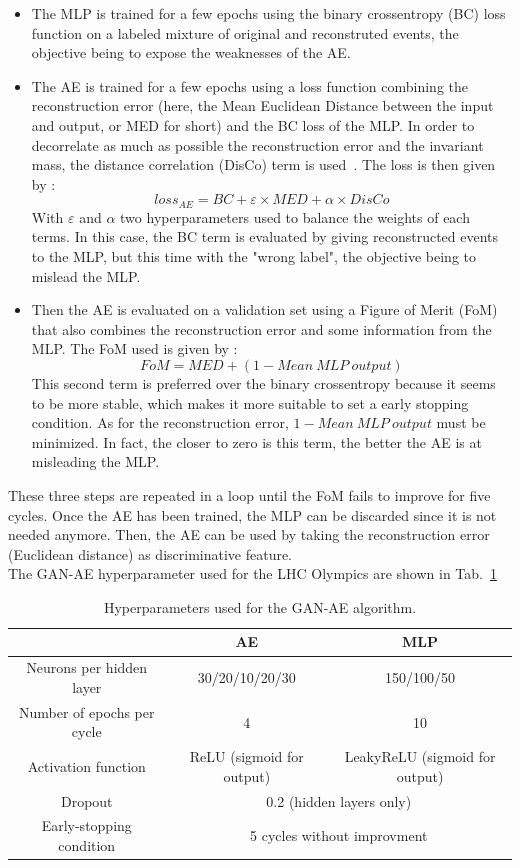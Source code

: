 \documentclass[letterpaper,11pt]{article}
\begin{document}
\begin{itemize}
	\item The MLP is trained for a few epochs using the binary crossentropy (BC) loss function on a labeled mixture of original and reconstruted events, the objective being to expose the weaknesses of the AE.
	
	\item The AE is trained for a few epochs using a loss function combining the reconstruction error (here, the Mean Euclidean Distance between the input and output, or MED for short) and the BC loss of the MLP.
	In order to decorrelate as much as possible the reconstruction error and the invariant mass, the distance correlation (DisCo) term is used~\cite{DiscoFever}.
	The loss is then given by :
	$$loss_{AE} = BC+\varepsilon\times MED+\alpha\times DisCo$$
	\noindent With $\varepsilon$ and $\alpha$ two hyperparameters used to balance the weights of each terms. In this case, the BC term is evaluated by giving reconstructed events to the MLP, but this time with the "wrong label", the objective being to mislead the MLP. 
	
	\item Then the AE is evaluated on a validation set using a Figure of Merit (FoM) that also combines the reconstruction error and some information from the MLP.
	The FoM used is given by :
	$$FoM = MED+(1-Mean~MLP~output)$$
	\noindent This second term is preferred over the binary crossentropy because it seems to be more stable, which makes it more suitable to set a early stopping condition.
	As for the reconstruction error, $1-Mean~MLP~output$ must be minimized.
	In fact, the closer to zero is this term, the better the AE is at misleading the MLP.
\end{itemize}

\noindent These three steps are repeated in a loop until the FoM fails to improve for five cycles. Once the AE has been trained, the MLP can be discarded since it is not needed anymore. Then, the AE can be used by taking the reconstruction error (Euclidean distance) as discriminative feature.\\

\noindent The GAN-AE hyperparameter used for the LHC Olympics are shown in Tab.~\ref{tab:param_GAE}
\begin{table}[h!]
	\centering
	\begin{tabular}{|c|c|c|}
		\hline
		 & AE & MLP \\
		\hline
		Neurons per hidden layer & 30/20/10/20/30 &  150/100/50 \\
		\hline
		Number of epochs per cycle & 4 & 10 \\
		\hline
		Activation function & ReLU (sigmoid for output) & LeakyReLU (sigmoid for output) \\
		\hline
		Dropout & \multicolumn{2}{|c|}{ 0.2 (hidden layers only)} \\
		\hline
		Early-stopping condition & \multicolumn{2}{|c|}{5 cycles without improvment} \\
		\hline
	\end{tabular}
	\caption{Hyperparameters used for the GAN-AE algorithm.}
	\label{tab:param_GAE}
\end{table}
\end{document}
